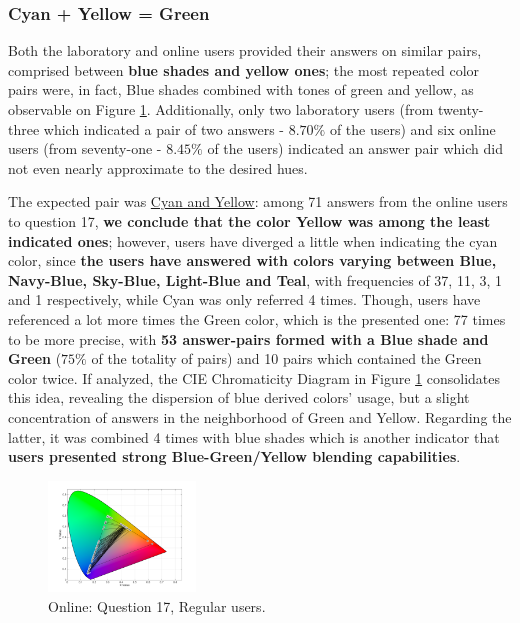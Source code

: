 \subsubsection{Cyan + Yellow = Green}
%
Both the laboratory and online users provided their answers on similar pairs, comprised between \textbf{blue shades
and yellow ones}; the most repeated color pairs were, in fact, Blue shades combined with tones of green and yellow,
as observable on Figure \ref{fig:greenblend_1}. Additionally, only two laboratory users (from twenty-three which
indicated a pair of two answers - $8.70\%$ of the users) and six online users (from seventy-one - $8.45\%$ of the
users) indicated an answer pair which did not even nearly approximate to the desired hues. \par
%
The expected pair was \ul{Cyan and Yellow}: among 71 answers from the online users to question 17, \textbf{we conclude
that the color Yellow was among the least indicated ones}; however, users have diverged a little when indicating the cyan
color, since \textbf{the users have answered with colors varying between Blue, Navy-Blue, Sky-Blue, Light-Blue and
Teal}, with frequencies of 37, 11, 3, 1 and 1 respectively, while Cyan was only referred 4 times. Though, users
have referenced a lot more times the Green color, which is the presented one: 77 times to be more precise, with
\textbf{53 answer-pairs formed with a Blue shade and Green} ($75\%$ of the totality of pairs) and 10 pairs which
contained the Green color twice. If analyzed, the CIE Chromaticity Diagram in Figure \ref{fig:greenblend_1}
consolidates this idea, revealing the dispersion of blue derived colors' usage, but a slight concentration of
answers in the neighborhood of Green and Yellow. Regarding the latter, it was combined 4 times with blue shades
which is another indicator that \textbf{users presented strong Blue-Green/Yellow blending capabilities}.
%
\begin{figure}[!htbp]
  \centering
  \includegraphics[width=0.35\textwidth]{images/17_online_regularUsers.png}
  \caption{Online: Question 17, Regular users.}
  \label{fig:greenblend_1}
\end{figure}
%
